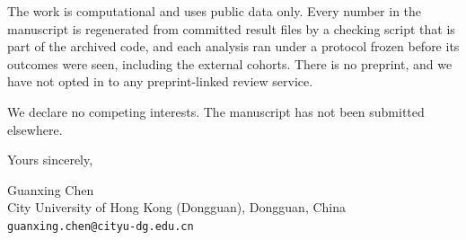 \documentclass[11pt]{article}
\begin{document}
The work is computational and uses public data only. Every number in the manuscript is regenerated
from committed result files by a checking script that is part of the archived code, and each analysis
ran under a protocol frozen before its outcomes were seen, including the external cohorts. There is
no preprint, and we have not opted in to any preprint-linked review service.

We declare no competing interests. The manuscript has not been submitted elsewhere.

Yours sincerely,

Guanxing Chen \\
City University of Hong Kong (Dongguan), Dongguan, China \\
\texttt{guanxing.chen@cityu-dg.edu.cn}
\end{document}

